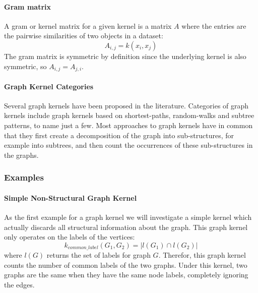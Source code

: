 

\paragraph{Gram matrix}
A gram or kernel matrix for a given kernel is a matrix $A$ where the entries are the pairwise similarities of two objects in a dataset:
\begin{equation*}
    A_{i,j} = k(x_i, x_j)
\end{equation*}
The gram matrix is symmetric by definition since the underlying kernel is also symmetric, so $A_{i,j} = A_{j, i}$.

\paragraph{Graph Kernel Categories}
Several graph kernels have been proposed in the literature.
Categories of graph kernels include graph kernels based on shortest-paths, random-walks and subtree patterns, to name just a few.
Most approaches to graph kernels have in common that they first create a decomposition of the graph into sub-structures, for example into subtrees, and then count the occurrences of these sub-structures in the graphs.


\subsubsection{Examples}
\paragraph{Simple Non-Structural Graph Kernel}
As the first example for a graph kernel we will investigate a simple kernel which actually discards all structural information about the graph. This graph kernel only operates on the labels of the vertices:
\begin{equation*}
k_{common\_label}(G_1, G_2) = | l(G_1) \cap l(G_2) |
\end{equation*}
where $l(G)$ returns the set of labels for graph $G$.
Therefor, this graph kernel counts the number of common labels of the two graphs. Under this kernel, two graphs are the same when they have the same node labels, completely ignoring the edges.

